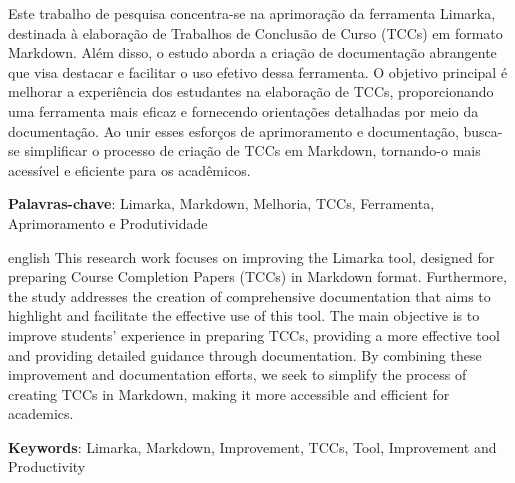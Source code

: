 \documentclass[
	12pt,				%
	oneside,			%
	a4paper,			%
	english,			%
	french,				%
	spanish,			%
	brazil				%
	]{abntex2}
\begin{document}
\setlength{\absparsep}{18pt} %
\begin{resumo}

  Este trabalho de pesquisa concentra-se na aprimoração da ferramenta
  Limarka, destinada à elaboração de Trabalhos de Conclusão de Curso
  (TCCs) em formato Markdown. Além disso, o estudo aborda a criação de
  documentação abrangente que visa destacar e facilitar o uso efetivo
  dessa ferramenta. O objetivo principal é melhorar a experiência dos
  estudantes na elaboração de TCCs, proporcionando uma ferramenta mais
  eficaz e fornecendo orientações detalhadas por meio da documentação. Ao
  unir esses esforços de aprimoramento e documentação, busca-se
  simplificar o processo de criação de TCCs em Markdown, tornando-o mais
  acessível e eficiente para os acadêmicos.

 \textbf{Palavras-chave}: Limarka, Markdown, Melhoria, TCCs, Ferramenta, Aprimoramento e
Produtividade
\end{resumo}



\begin{resumo}[Abstract]
 \begin{otherlanguage*}{english}
   This research work focuses on improving the Limarka tool, designed for
   preparing Course Completion Papers (TCCs) in Markdown format.
   Furthermore, the study addresses the creation of comprehensive
   documentation that aims to highlight and facilitate the effective use of
   this tool. The main objective is to improve students' experience in
   preparing TCCs, providing a more effective tool and providing detailed
   guidance through documentation. By combining these improvement and
   documentation efforts, we seek to simplify the process of creating TCCs
   in Markdown, making it more accessible and efficient for academics.

   \vspace{\onelineskip}
 
   \noindent 
   \textbf{Keywords}: Limarka, Markdown, Improvement, TCCs, Tool, Improvement and Productivity
 \end{otherlanguage*}
\end{resumo}





\end{document}
